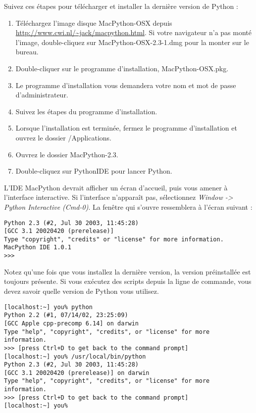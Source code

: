 Suivez ces étapes pour télécharger et installer la dernière version de Python :

\begin{enumerate}
    \item{Téléchargez l'image disque MacPython-OSX depuis \url{http://www.cwi.nl/~jack/macpython.html}. Si votre navigateur n'a pas monté l'image, double-cliquez sur MacPython-OSX-2.3-1.dmg pour la monter sur le bureau.}
    \item{Double-cliquer sur le programme d'installation, MacPython-OSX.pkg.}
    \item{Le programme d'installation vous demandera votre nom et mot de passe d'administrateur.}
    \item{Suivez les étapes du programme d'installation.}
    \item{Lorsque l'installation est terminée, fermez le programme d'installation et ouvrez le dossier /Applications.}
    \item{Ouvrez le dossier MacPython-2.3.}
    \item{Double-cliquez sur PythonIDE pour lancer Python.}
\end{enumerate}

\medskip
L'IDE MacPython devrait afficher un écran d'accueil, puis vous amener à l'interface interactive. Si l'interface n'apparaît pas, sélectionnez \emph{Window -> Python Interactive (Cmd-0)}. La fenêtre qui s'ouvre ressemblera à l'écran suivant :

\begin{lstlisting}
Python 2.3 (#2, Jul 30 2003, 11:45:28)
[GCC 3.1 20020420 (prerelease)]
Type "copyright", "credits" or "license" for more information.
MacPython IDE 1.0.1
>>>
\end{lstlisting}

Notez qu'une fois que vous installez la dernière version, la version préinstallée est toujours présente. Si vous exécutez des scripts depuis la ligne de commande, vous devez savoir quelle version de Python vous utilisez.

\begin{example}
\begin{lstlisting}[style=none]
[localhost:~] you% python
Python 2.2 (#1, 07/14/02, 23:25:09)
[GCC Apple cpp-precomp 6.14] on darwin
Type "help", "copyright", "credits", or "license" for more information.
>>> [press Ctrl+D to get back to the command prompt]
[localhost:~] you% /usr/local/bin/python
Python 2.3 (#2, Jul 30 2003, 11:45:28)
[GCC 3.1 20020420 (prerelease)] on darwin
Type "help", "copyright", "credits", or "license" for more information.
>>> [press Ctrl+D to get back to the command prompt]
[localhost:~] you%
\end{lstlisting}
\end{example}

